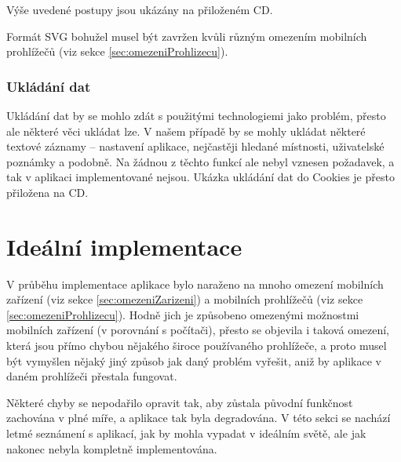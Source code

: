 Výše uvedené postupy jsou ukázány na přiloženém CD.

Formát SVG bohužel musel být zavržen kvůli různým omezením mobilních prohlížečů (viz sekce \ref{sec:omezeniProhlizecu}).

\subsubsection{Ukládání dat}
Ukládání dat by se mohlo zdát s použitými technologiemi jako problém, přesto ale některé věci ukládat lze. V našem případě by se mohly ukládat některé textové záznamy -- nastavení aplikace, nejčastěji hledané místnosti, uživatelské poznámky a podobně. Na žádnou z těchto funkcí ale nebyl vznesen požadavek, a tak v aplikaci implementované nejsou. Ukázka ukládání dat do Cookies je přesto přiložena na CD.



\section{Ideální implementace}
V průběhu implementace aplikace bylo naraženo na mnoho omezení mobilních zařízení (viz sekce \ref{sec:omezeniZarizeni}) a mobilních prohlížečů (viz sekce \ref{sec:omezeniProhlizecu}). Hodně jich je způsobeno omezenými možnostmi mobilních zařízení (v porovnání s počítači), přesto se objevila i taková omezení, která jsou přímo chybou nějakého široce používaného prohlížeče, a proto musel být vymyšlen nějaký jiný způsob jak daný problém vyřešit, aniž by aplikace v daném prohlížeči přestala fungovat.

Některé chyby se nepodařilo opravit tak, aby zůstala původní funkčnost zachována v plné míře, a aplikace tak byla degradována. V této sekci se nachází letmé seznámení s aplikací, jak by mohla vypadat v ideálním světě, ale jak nakonec nebyla kompletně implementována.

